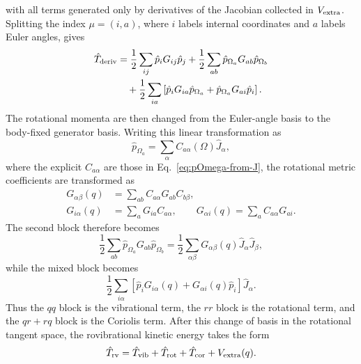 \documentclass[11pt]{revtex4-2}
\begin{document}
with all terms generated only by derivatives of the Jacobian collected in
$V_{\rm extra}$.  Splitting the index
$\mu=(i,a)$, where $i$ labels internal coordinates and $a$ labels Euler
angles, gives
\begin{align*}
  \hat{T}_{\rm deriv}
  &=
  \frac{1}{2}
  \sum_{ij}
  \hat{p}_iG_{ij}\hat{p}_j
  +
  \frac{1}{2}
  \sum_{ab}
  \hat{p}_{\Omega_a}G_{ab}\hat{p}_{\Omega_b}
  \\
  &\quad+
  \frac{1}{2}
  \sum_{ia}
  \left[
    \hat{p}_iG_{ia}\hat{p}_{\Omega_a}
    +
    \hat{p}_{\Omega_a}G_{ai}\hat{p}_i
  \right].
\end{align*}
The rotational momenta are then changed from the Euler-angle basis to the
body-fixed generator basis.  Writing this linear transformation as
\begin{equation*}
  \hat{p}_{\Omega_a}
  =
  \sum_{\alpha}
  C_{a\alpha}(\Omega)\hat{J}_{\alpha},
\end{equation*}
where the explicit $C_{a\alpha}$ are those in
Eq.~\eqref{eq:pOmega-from-J}, the rotational metric coefficients are
transformed as
\begin{align*}
  G_{\alpha\beta}(q)
  &=
  \sum_{ab}
  C_{a\alpha}G_{ab}C_{b\beta},
  \\
  G_{i\alpha}(q)
  &=
  \sum_a
  G_{ia}C_{a\alpha},
  \qquad
  G_{\alpha i}(q)
  =
  \sum_a
  C_{a\alpha}G_{ai}.
\end{align*}
The second block therefore becomes
\begin{equation*}
  \frac{1}{2}
  \sum_{ab}
  \hat{p}_{\Omega_a}G_{ab}\hat{p}_{\Omega_b}
  =
  \frac{1}{2}
  \sum_{\alpha\beta}
  G_{\alpha\beta}(q)
  \hat{J}_{\alpha}\hat{J}_{\beta},
\end{equation*}
while the mixed block becomes
\begin{equation*}
  \frac{1}{2}
  \sum_{i\alpha}
  \left[
    \hat{p}_iG_{i\alpha}(q)
    +
    G_{\alpha i}(q)\hat{p}_i
  \right]
  \hat{J}_{\alpha}.
\end{equation*}
Thus the $qq$ block is the vibrational term, the $rr$ block is the
rotational term, and the $qr+rq$ block is the Coriolis term.  After this
change of basis in the rotational tangent space, the
rovibrational kinetic energy takes the form
\begin{equation}
  \hat{T}_{\rm rv}
  =
  \hat{T}_{\rm vib}
  +
  \hat{T}_{\rm rot}
  +
  \hat{T}_{\rm cor}
  +
  V_{\rm extra}(q).
  \label{eq:t-rovib}
\end{equation}
\end{document}
